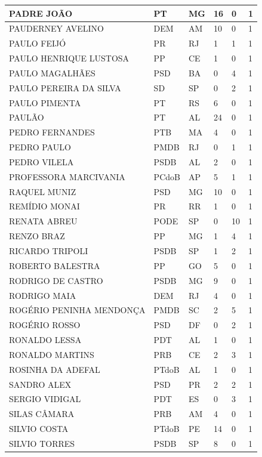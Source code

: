 \begin{apendicesenv}
\begin{longtable}{|L{4cm}|C{2cm}|C{1cm}|C{2cm}|C{1cm}|C{2cm}|}
PADRE JOÃO & PT & MG & 16 & 0 & 1 \\ \hline
PAUDERNEY AVELINO & DEM & AM & 10 & 0 & 1 \\ \hline
PAULO FEIJÓ & PR & RJ & 1 & 1 & 1 \\ \hline
PAULO HENRIQUE LUSTOSA & PP & CE & 1 & 0 & 1 \\ \hline
PAULO MAGALHÃES & PSD & BA & 0 & 4 & 1 \\ \hline
PAULO PEREIRA DA SILVA & SD & SP & 0 & 2 & 1 \\ \hline
PAULO PIMENTA & PT & RS & 6 & 0 & 1 \\ \hline
PAULÃO & PT & AL & 24 & 0 & 1 \\ \hline
PEDRO FERNANDES & PTB & MA & 4 & 0 & 1 \\ \hline
PEDRO PAULO & PMDB & RJ & 0 & 1 & 1 \\ \hline
PEDRO VILELA & PSDB & AL & 2 & 0 & 1 \\ \hline
PROFESSORA MARCIVANIA & PCdoB & AP & 5 & 1 & 1 \\ \hline
RAQUEL MUNIZ & PSD & MG & 10 & 0 & 1 \\ \hline
REMÍDIO MONAI & PR & RR & 1 & 0 & 1 \\ \hline
RENATA ABREU & PODE & SP & 0 & 10 & 1 \\ \hline
RENZO BRAZ & PP & MG & 1 & 4 & 1 \\ \hline
RICARDO TRIPOLI & PSDB & SP & 1 & 2 & 1 \\ \hline
ROBERTO BALESTRA & PP & GO & 5 & 0 & 1 \\ \hline
RODRIGO DE CASTRO & PSDB & MG & 9 & 0 & 1 \\ \hline
RODRIGO MAIA & DEM & RJ & 4 & 0 & 1 \\ \hline
ROGÉRIO PENINHA MENDONÇA & PMDB & SC & 2 & 5 & 1 \\ \hline
ROGÉRIO ROSSO & PSD & DF & 0 & 2 & 1 \\ \hline
RONALDO LESSA & PDT & AL & 1 & 0 & 1 \\ \hline
RONALDO MARTINS & PRB & CE & 2 & 3 & 1 \\ \hline
ROSINHA DA ADEFAL & PTdoB & AL & 1 & 0 & 1 \\ \hline
SANDRO ALEX & PSD & PR & 2 & 2 & 1 \\ \hline
SERGIO VIDIGAL & PDT & ES & 0 & 3 & 1 \\ \hline
SILAS CÂMARA & PRB & AM & 4 & 0 & 1 \\ \hline
SILVIO COSTA & PTdoB & PE & 14 & 0 & 1 \\ \hline
SILVIO TORRES & PSDB & SP & 8 & 0 & 1 \\ \hline

\end{longtable}
\end{apendicesenv}
